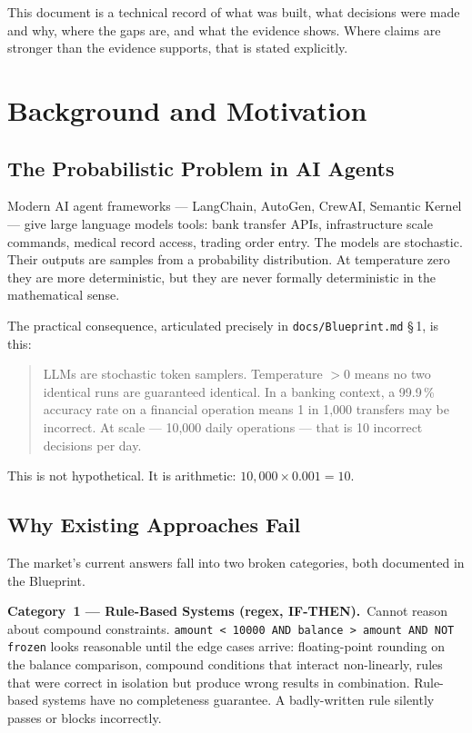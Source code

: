 \documentclass[12pt,a4paper,oneside]{report}
\newcommand{\fname}[1]{\texttt{#1}}          %
\newcommand{\code}[1]{\texttt{#1}}           %
\newcommand{\cfrsec}[1]{\S\,#1}             %
\begin{document}
This document is a technical record of what was built, what decisions were
made and why, where the gaps are, and what the evidence shows.  Where claims
are stronger than the evidence supports, that is stated explicitly.

\newpage
\tableofcontents
\newpage

\chapter{Background and Motivation}

\section{The Probabilistic Problem in AI Agents}

Modern AI agent frameworks --- LangChain, AutoGen, CrewAI, Semantic Kernel ---
give large language models tools: bank transfer APIs, infrastructure scale
commands, medical record access, trading order entry. The models are
stochastic. Their outputs are samples from a probability distribution. At
temperature zero they are more deterministic, but they are never formally
deterministic in the mathematical sense.

The practical consequence, articulated precisely in \fname{docs/Blueprint.md}
\cfrsec{1}, is this:

\begin{quote}
LLMs are stochastic token samplers. Temperature $> 0$ means no two identical
runs are guaranteed identical. In a banking context, a 99.9\,\% accuracy rate
on a financial operation means 1 in 1,000 transfers may be incorrect. At scale
--- 10,000 daily operations --- that is 10 incorrect decisions per day.
\end{quote}

This is not hypothetical. It is arithmetic: $10{,}000 \times 0.001 = 10$.

\section{Why Existing Approaches Fail}

The market's current answers fall into two broken categories, both documented
in the Blueprint.

\textbf{Category~1 --- Rule-Based Systems (regex, IF-THEN).}\ Cannot reason
about compound constraints. \code{amount < 10000 AND balance > amount AND NOT
frozen} looks reasonable until the edge cases arrive: floating-point rounding
on the balance comparison, compound conditions that interact non-linearly,
rules that were correct in isolation but produce wrong results in combination.
Rule-based systems have no completeness guarantee. A badly-written rule
silently passes or blocks incorrectly.
\end{document}
